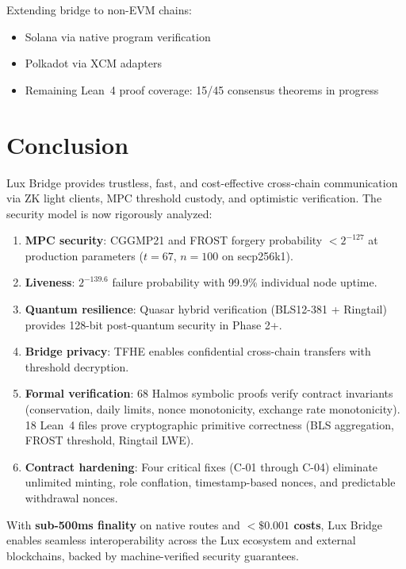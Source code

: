 \documentclass[11pt]{article}
\begin{document}
Extending bridge to non-EVM chains:
\begin{itemize}[leftmargin=1.1em]
  \item Solana via native program verification
  \item Polkadot via XCM adapters
  \item Remaining Lean~4 proof coverage: 15/45 consensus theorems in progress
\end{itemize}

\section{Conclusion}

Lux Bridge provides trustless, fast, and cost-effective cross-chain communication via ZK light clients, MPC threshold custody, and optimistic verification. The security model is now rigorously analyzed:

\begin{enumerate}[leftmargin=1.1em]
  \item \textbf{MPC security}: CGGMP21 and FROST forgery probability $< 2^{-127}$ at production parameters ($t = 67$, $n = 100$ on secp256k1).
  \item \textbf{Liveness}: $2^{-139.6}$ failure probability with 99.9\% individual node uptime.
  \item \textbf{Quantum resilience}: Quasar hybrid verification (BLS12-381 + Ringtail) provides 128-bit post-quantum security in Phase 2+.
  \item \textbf{Bridge privacy}: TFHE enables confidential cross-chain transfers with threshold decryption.
  \item \textbf{Formal verification}: 68 Halmos symbolic proofs verify contract invariants (conservation, daily limits, nonce monotonicity, exchange rate monotonicity). 18 Lean~4 files prove cryptographic primitive correctness (BLS aggregation, FROST threshold, Ringtail LWE).
  \item \textbf{Contract hardening}: Four critical fixes (C-01 through C-04) eliminate unlimited minting, role conflation, timestamp-based nonces, and predictable withdrawal nonces.
\end{enumerate}

With \textbf{sub-500ms finality} on native routes and \textbf{$< \$0.001$ costs}, Lux Bridge enables seamless interoperability across the Lux ecosystem and external blockchains, backed by machine-verified security guarantees.
\end{document}
